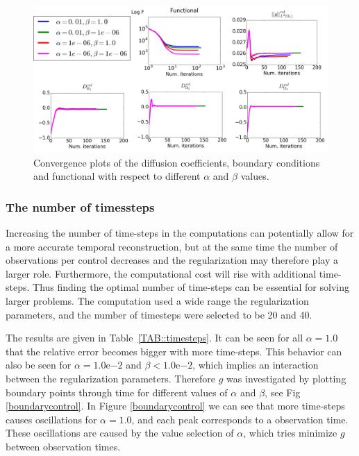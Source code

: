 \documentclass[11pt,a4paper]{article}
\begin{document}
\begin{figure}
\centering
\includegraphics[scale=0.18]{Convergence-plot.png}   
\caption{Convergence plots of the diffusion coefficients, boundary conditions and functional with respect to different $\alpha$ and $\beta$ values. } 
\label{convergence}
\end{figure}

\subsubsection{The number of timessteps}
Increasing the number of time-steps in the computations can potentially allow for a more accurate temporal reconstruction, but at the same time the number of observations per control decreases and the regularization may therefore play a larger role. Furthermore, the computational cost will rise with additional time-steps. Thus finding the optimal number of time-steps can be essential for solving larger problems. The computation used a wide range the regularization parameters, and the number of timesteps were selected to be 20 and 40.

The results are given in Table~\ref{TAB::timesteps}. It can be seen for all $\alpha=1.0$ that the relative error becomes bigger with more time-steps. This behavior can also be seen for $\alpha=1.0\mathrm{e}{-2}$ and $\beta < 1.0\mathrm{e}{-2}$, which implies an interaction between the regularization parameters. Therefore $g$ was investigated by plotting boundary points through time for different values of $\alpha$ and $\beta$, see Fig \ref{boundarycontrol}. In Figure \ref{boundarycontrol} we can see that more time-steps causes oscillations for $\alpha=1.0$, and each peak corresponds to a observation time. These oscillations are caused by the value selection of $\alpha$, which tries minimize $g$ between observation times.

\end{document}
